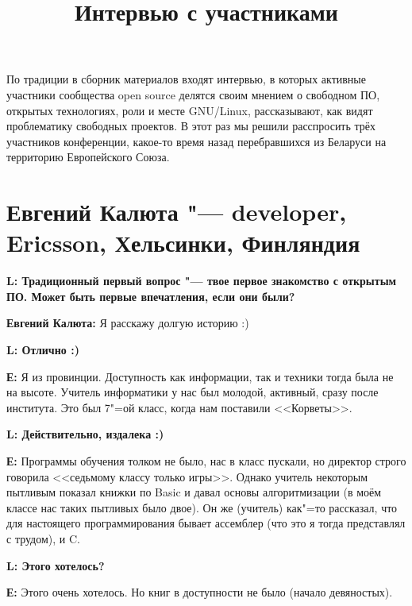 \documentclass[10pt, a5paper]{article}
\begin{document}
\title{Интервью с участниками}
\date{}
\maketitle

По традиции в сборник материалов входят интервью, в которых активные участники сообщества open source делятся своим мнением о свободном ПО, открытых технологиях, роли и месте GNU/Linux, рассказывают, как видят проблематику свободных проектов. В этот раз мы решили расспросить трёх участников конференции, какое-то время назад перебравшихся из Беларуси на территорию Европейского Союза.



\section[Евгений Калюта "--- developer, Ericsson, Хельсинки, Финляндия]{Евгений Калюта "--- developer,  Ericsson, \linebreak Хельсинки, Финляндия}


{\noindent \bf L: Традиционный первый вопрос "--- твое первое знакомство с открытым ПО. Может быть первые впечатления, если они были?}

{\noindent \bf Евгений Калюта:} Я расскажу долгую историю :) 

{\noindent \bf L: Отлично :)}

{\noindent \bf Е:} Я из провинции. Доступность как информации, так и техники тогда была не на высоте. Учитель информатики у нас был молодой, активный, сразу после
института. Это был 7"=ой класс, когда нам поставили <<Корветы>>. 

{\noindent \bf L: Действительно, издалека :)}


{\noindent \bf Е:} Программы обучения толком не было, нас в класс пускали, но директор строго говорила
<<седьмому классу только игры>>. Однако учитель некоторым пытливым показал книжки по Basic и давал основы алгоритмизации (в моём классе нас таких пытливых было двое). Он же (учитель) как"=то рассказал, что для настоящего
программирования бывает ассемблер (что это я тогда представлял с трудом), и C.

{\noindent \bf L: Этого хотелось?}

{\noindent \bf Е:} Этого очень хотелось. Но книг в доступности не было (начало девяностых).
\end{document}
